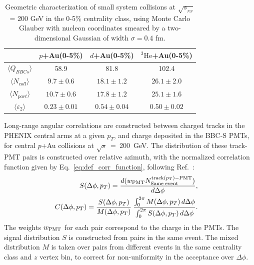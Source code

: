 \documentclass[%
reprint,
showpacs,preprintnumbers,
 amsmath,amssymb,
 aps,
]{revtex4-1}
\newcommand{\pt}{\mbox{$p_T$}\xspace}
\newcommand{\sqs}{\mbox{$\sqrt{s}$}\xspace}
\newcommand{\sqsn}{\mbox{$\sqrt{s_{_{NN}}}$}\xspace}
\newcommand{\dau}{\mbox{$d$+Au}\xspace}
\newcommand{\pau}{\mbox{$p$+Au}\xspace}
\newcommand{\hau}{\mbox{$^3\text{He}$+Au}\xspace}
\begin{document}
\begin{table}
\caption{Geometric characterization of small system collisions at \sqsn = 200 GeV in the 0-5\% centrality class, using Monte Carlo Glauber with nucleon coordinates smeared by a two-dimensional Gaussian of width $\sigma=0.4$ fm.}
\begin{ruledtabular}
\begin{tabular}{c c c c}
\label{table_geometry}
 & \pau (0-5\%) & \dau (0-5\%) & \hau (0-5\%) \\
\hline
 $\langle Q_{BBCs} \rangle$ & 58.9 & 81.8 & 102.4 \\
 $\langle N_{coll} \rangle$ & $9.7\pm 0.6$ & $18.1\pm 1.2$ & $26.1\pm 2.0$ \\
 $\langle N_{part} \rangle$ & $10.7\pm 0.6$ & $17.8\pm 1.2$ & $25.1\pm  1.6$ \\ 
 $\langle \varepsilon_2 \rangle$ & $0.23\pm 0.01$ & $0.54\pm 0.04$ & $0.50\pm 0.02$
\end{tabular}
\end{ruledtabular}
\end{table}

Long-range angular correlations are constructed between charged tracks in the PHENIX central arms at a given \pt, and charge deposited in the BBC-S PMTs, for central \pau collisions at \sqs~=~200~GeV. The distribution of these track-PMT pairs is constructed over relative azimuth, with the normalized correlation function given by Eq.~\ref{eq:def_corr_function}, following Ref.~\cite{PhysRevLett.115.142301}:
\begin{eqnarray}
  S(\Delta\phi,p_{T})=
  \frac{ d(w_{{\rm PMT}} N^{{\rm track}(p_{T}){\rm - PMT}}_{{\rm Same \; event}}) }{ d\Delta\phi}, & &
\label{eq31} \\
  C(\Delta\phi,p_{T}) =
          \frac{S(\Delta\phi,p_{T})}{M(\Delta\phi,p_{T})} \:
          \frac{\int_{0}^{2\pi} M(\Delta\phi,p_{T}) \, d\Delta\phi}{\int_{0}^{2\pi} S(\Delta\phi,p_{T}) \, d\Delta\phi}. & &
  \label{eq:def_corr_function}
\end{eqnarray}
The weights $w_{{\rm PMT}}$ for each pair correspond to the charge in the PMTs. The signal distribution $S$ is constructed from pairs in the same event. The mixed distribution $M$ is taken over pairs from different events in the same centrality class and $z$ vertex bin, to correct for non-uniformity in the acceptance over $\Delta \phi$.
\end{document}
